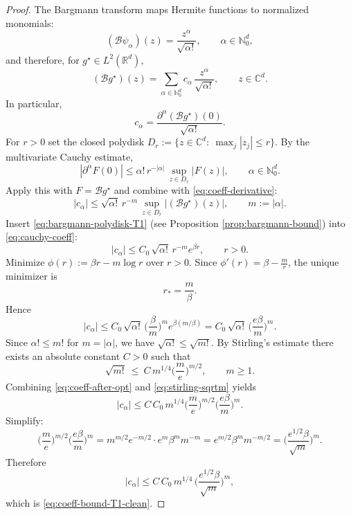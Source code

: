 \documentclass[11pt]{article}
\theoremstyle{remark}
\numberwithin{equation}{section}
\newcommand{\C}{\mathbb{C}}
\newcommand{\R}{\mathbb{R}}
\newcommand{\N}{\mathbb{N}}
\begin{document}
\begin{proof}
The Bargmann transform maps Hermite functions to normalized monomials:
\[
(\mathcal B\psi_\alpha)(z)=\frac{z^\alpha}{\sqrt{\alpha!}},\qquad \alpha\in\N_0^d,
\]
and therefore, for $g^\star\in L^2(\R^d)$,
\[
(\mathcal B g^\star)(z)=\sum_{\alpha\in\N_0^d} c_\alpha\,\frac{z^\alpha}{\sqrt{\alpha!}},
\qquad z\in\C^d.
\]
In particular,
\begin{equation}\label{eq:coeff-derivative}
c_\alpha=\frac{\partial^\alpha(\mathcal B g^\star)(0)}{\sqrt{\alpha!}}.
\end{equation}
For $r>0$ set the closed polydisk $D_r:=\{z\in\C^d:\ \max_j|z_j|\le r\}$.
By the multivariate Cauchy estimate,
\[
|\partial^\alpha F(0)|
\le \alpha!\,r^{-|\alpha|}\,\sup_{z\in D_r}|F(z)|,
\qquad \alpha\in\N_0^d.
\]
Apply this with $F=\mathcal B g^\star$ and combine with \eqref{eq:coeff-derivative}:
\begin{equation}\label{eq:cauchy-coeff}
|c_\alpha|
\le
\sqrt{\alpha!}\,r^{-m}\,\sup_{z\in D_r}|(\mathcal B g^\star)(z)|,
\qquad m:=|\alpha|.
\end{equation}
Insert \eqref{eq:bargmann-polydisk-T1} (see Proposition \ref{prop:bargmann-bound}) into \eqref{eq:cauchy-coeff}:
\[
|c_\alpha|
\le
C_0\,\sqrt{\alpha!}\,r^{-m}e^{\beta r},
\qquad r>0.
\]
Minimize $\phi(r):=\beta r-m\log r$ over $r>0$. Since
$\phi'(r)=\beta-\frac{m}{r}$, the unique minimizer is
\[
r_\ast=\frac{m}{\beta}.
\]
Hence
\begin{equation}\label{eq:coeff-after-opt}
|c_\alpha|
\le
C_0\,\sqrt{\alpha!}\,
\Big(\frac{\beta}{m}\Big)^m
e^{\beta(m/\beta)}
=
C_0\,\sqrt{\alpha!}\,
\Big(\frac{e\beta}{m}\Big)^m.
\end{equation}
Since $\alpha!\le m!$ for $m=|\alpha|$, we have $\sqrt{\alpha!}\le \sqrt{m!}$.
By Stirling's estimate there exists an absolute constant $C>0$ such that
\begin{equation}\label{eq:stirling-sqrtm}
\sqrt{m!}\ \le\ C\,m^{1/4}\Big(\frac{m}{e}\Big)^{m/2},
\qquad m\ge 1.
\end{equation}
Combining \eqref{eq:coeff-after-opt} and \eqref{eq:stirling-sqrtm} yields
\[
|c_\alpha|
\le
C\,C_0\,m^{1/4}\Big(\frac{m}{e}\Big)^{m/2}\Big(\frac{e\beta}{m}\Big)^m.
\]
Simplify:
\[
\Big(\frac{m}{e}\Big)^{m/2}\Big(\frac{e\beta}{m}\Big)^m
=
m^{m/2}e^{-m/2}\cdot e^m\beta^m m^{-m}
=
e^{m/2}\beta^m m^{-m/2}
=
\Big(\frac{e^{1/2}\beta}{\sqrt m}\Big)^m.
\]
Therefore
\[
|c_\alpha|
\le
C\,C_0\,
m^{1/4}\,
\Big(\frac{e^{1/2}\beta}{\sqrt m}\Big)^m,
\]
which is \eqref{eq:coeff-bound-T1-clean}.
\end{proof}
\end{document}
